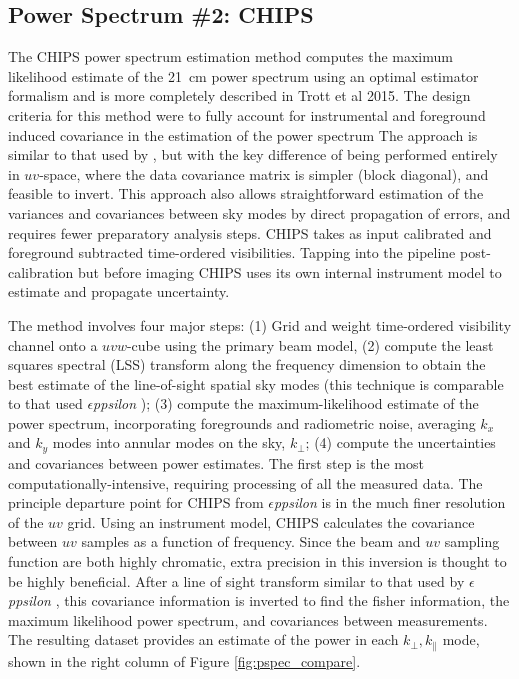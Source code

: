 \documentclass[preprint]{aastex}
\def\eppsilon{{\it $\epsilon$ppsilon }}
\def\chipscite{Trott et al 2015}
\begin{document}
\subsection{Power Spectrum \#2: CHIPS}
\label{sec:CHIPS}
The CHIPS power spectrum estimation method computes the maximum likelihood estimate of the 21~cm power spectrum using an optimal estimator formalism and is more completely described in \chipscite.  The design criteria for this method were to fully account for instrumental and foreground induced covariance in the estimation of the power spectrum  The approach is similar to that used by \cite{Liu:2011p8763}, but with the key difference of being performed entirely in $uv$-space, where the data covariance matrix is simpler (block diagonal), and feasible to invert. This approach also allows straightforward estimation of the variances and covariances between sky modes by direct propagation of errors, and requires fewer preparatory analysis steps. CHIPS takes as input calibrated and foreground subtracted time-ordered visibilities. Tapping into the pipeline post-calibration but before imaging CHIPS uses its own internal instrument model to estimate and propagate uncertainty.	

The method involves four major steps: (1) Grid and weight time-ordered visibility channel onto a $uvw$-cube using the primary beam model, (2) compute the least squares spectral (LSS) transform along the frequency dimension to obtain the best estimate of the line-of-sight spatial sky modes (this technique is comparable to that used \eppsilon); (3) compute the maximum-likelihood estimate of the power spectrum, incorporating foregrounds and radiometric noise,  averaging $k_x$ and $k_y$ modes into annular modes on the sky, $k_\bot$; (4) compute the uncertainties and covariances between power estimates. The first step is the most computationally-intensive, requiring processing of all the measured data. The principle departure point for CHIPS from \eppsilon is in the much finer resolution of the $uv$ grid.  Using an instrument model, CHIPS calculates the covariance between $uv$ samples as a function of frequency.  Since the beam and $uv$ sampling function are both highly chromatic, extra precision in this inversion is thought to be highly beneficial. After a line of sight transform similar to that used by \eppsilon, this covariance information is inverted to find the fisher information, the maximum likelihood power spectrum, and covariances between measurements.  The resulting dataset provides an estimate of the power in each $k_\bot,k_\parallel$ mode, shown in the right column of Figure \ref{fig:pspec_compare}. 
\end{document}
